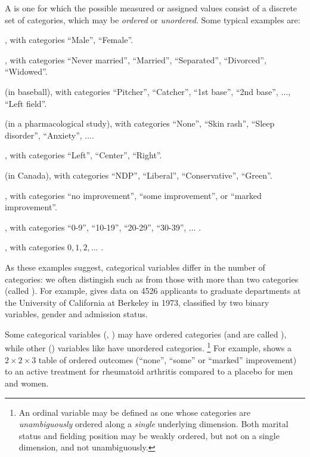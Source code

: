 \documentclass[11pt]{book}\usepackage[]{graphicx}\usepackage[]{color}
\begin{document}
A  is one for which the possible measured
or assigned values
consist of a discrete set of categories, which may be \emph{ordered} or
\emph{unordered}.
Some typical examples are:
\begin{itemize*}
\item {}, with categories ``Male'', ``Female''.
\item {}, with categories ``Never married'', ``Married'',
``Separated'', ``Divorced'', ``Widowed''.
\item {} (in baseball), with categories
``Pitcher'', ``Catcher'', ``1st base'', ``2nd base'',  $\dots$, ``Left field''.
\item {} (in a pharmacological study), with categories
``None'', ``Skin rash'', ``Sleep disorder'', ``Anxiety'', $\dots$.
\item {}, with categories ``Left'', ``Center'', ``Right''.
\item {} (in Canada), with categories ``NDP'', ``Liberal'', ``Conservative'', ``Green''.
\item {}, with categories ``no improvement'', ``some
improvement'', or ``marked improvement''.
\item {}, with categories ``0-9'', ``10-19'', ``20-29'', ``30-39'', 
$\dots$ .
\item {}, with categories $0, 1, 2, \dots$ .
\end{itemize*}

As these examples suggest, categorical variables differ in the number of
categories: we often distingish 
 such as 
from those with more than two categories (called ).
For example,  gives data on 4526 applicants
to graduate departments at the University of California at Berkeley
in 1973, classified by two binary variables, gender and admission status.


Some categorical variables (, )
may have ordered categories (and are called ),
while other () variables like 
have unordered categories.%
\footnote{An ordinal variable may be defined as one whose categories are
\emph{unambiguously} ordered along a \emph{single} underlying dimension.
Both marital status and fielding position may be weakly ordered, but
not on a single dimension, and not unambiguously.} 
For example,  shows a $2 \times 2 \times 3$ table of 
ordered outcomes (``none'', ``some'' or ``marked'' improvement)
to an active treatment for rheumatoid
arthritis compared to a placebo for men and women.

\end{document}
